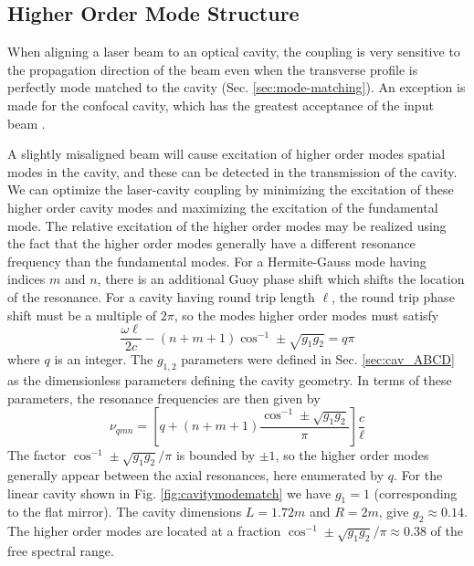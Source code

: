 \subsection{Higher Order Mode Structure} \label{sec:cav_alignment}
When aligning a laser beam to an optical cavity, the coupling is very sensitive to the propagation direction of the beam even when the transverse profile is perfectly mode matched to the cavity (Sec. \ref{sec:mode-matching}). An exception is made for the confocal cavity, which has the greatest acceptance of the input beam \cite{book_lasers_siegman}.

A slightly misaligned beam will cause excitation of higher order modes spatial modes in the cavity, and these can be detected in the transmission of the cavity. We can optimize the laser-cavity coupling by minimizing the excitation of these higher order cavity modes and maximizing the excitation of the fundamental mode. The relative excitation of the higher order modes may be realized using the fact that the higher order modes generally have a different resonance frequency than the fundamental modes. For a Hermite-Gauss mode having indices $m$ and $n$, there is an additional Guoy phase shift which shifts the location of the resonance. For a cavity having round trip length $\ell$, the round trip phase shift must be a multiple of $2\pi$, so the modes higher order modes must satisfy \cite{book_lasers_siegman}
\begin{equation}
	\frac{\omega \ell}{2c} - \left(n + m + 1\right)\cos^{-1}\pm \sqrt{g_1 g_2} = q \pi
\end{equation}
where $q$ is an integer. The $g_{1,2}$ parameters were defined in Sec. \ref{sec:cav_ABCD} as the dimensionless parameters defining the cavity geometry. In terms of these parameters, the resonance frequencies are then given by
\begin{equation} \label{cav_higherOrder_mode_freqs}
	\nu_{qmn} = \left[q + (n + m + 1) \frac{\cos^{-1}\pm\sqrt{g_1 g_2}}{\pi}\right] \frac{c}{\ell}
\end{equation}
The factor $\cos^{-1}\pm\sqrt{g_1 g_2}/\pi$ is bounded by $\pm 1$, so the higher order modes generally appear between the axial resonances, here enumerated by $q$. For the linear cavity shown in Fig. \ref{fig:cavitymodematch} we have $g_1 = 1$ (corresponding to the flat mirror). The cavity dimensions $L=1.72m$ and $R=2m$, give $g_2 \approx 0.14$. The higher order modes are located at a fraction $\cos^{-1}\pm\sqrt{g_1 g_2}/\pi \approx 0.38$ of the free spectral range.

